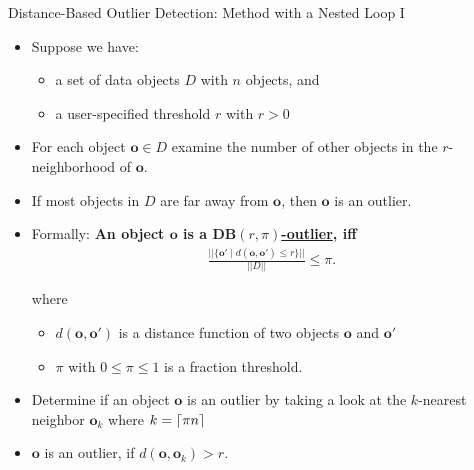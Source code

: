 \begin{frame}{Distance-Based Outlier Detection: Method with a Nested Loop I}
	\begin{itemize}
		\item Suppose we have:
		      \begin{itemize}
			      \item a set of data objects $D$ with $n$ objects, and
			      \item a user-specified threshold $r$ with $r > 0$
		      \end{itemize}
		\item For each object $\mathbf{o}\in D$ examine the number of other objects in the $r$-neighborhood of $\mathbf{o}$.
		\item If most objects in $D$ are far away from $\mathbf{o}$, then $\mathbf{o}$ is an outlier.
		\item Formally: \textbf{An object $\mathbf{o}$ is a \underline{$\mathbf{DB}(r, \pi)$-outlier}, iff}
		      \begin{align*}\label{db-outlier}
			      \frac{||\{\mathbf{o'} \; \vert \; d(\mathbf{o},\mathbf{o'}) \leq r \}|| }{||D||} \leq \pi.
		      \end{align*}

		      where
		      \begin{itemize}
			      \item $d(\mathbf{o},\mathbf{o}')$ is a distance function of two objects $\mathbf{o}$ and $\mathbf{o}'$
			      \item $\pi$ with $0\leq\pi\leq1$ is a fraction threshold.
		      \end{itemize}
		\item Determine if an object $\mathbf{o}$ is an outlier by taking a look at the $k$-nearest neighbor $\mathbf{o}_k$ where $k=\ceil*{\pi n}$
		\item $\mathbf{o}$ is an outlier, if $d(\mathbf{o}, \mathbf{o}_k) > r$.
	\end{itemize}
\end{frame}


